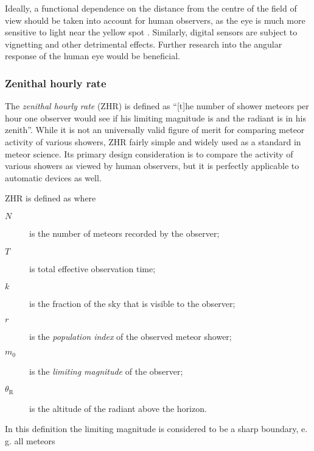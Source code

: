             Ideally, a functional dependence on the distance from the centre of the field
            of view should be taken into account for human observers, as the eye is much more
            sensitive to light near the yellow spot .
            Similarly, digital sensors are subject to vignetting and other detrimental effects.
            Further research into the angular response of the human eye would be beneficial.

        \subsubsection{Zenithal hourly rate} \label{ipqz}
            The \emph{zenithal hourly rate} (ZHR) is defined as ``[t]he number of shower meteors per hour
            one observer would see if his limiting magnitude is  and the radiant is in his zenith''.
            While it is not an universally valid figure of merit for comparing meteor activity of various showers,
            ZHR fairly simple and widely used as a standard in meteor science.
            Its primary design consideration is to compare the activity of various showers as viewed by human observers,
            but it is perfectly applicable to automatic devices as well.

            ZHR is defined as
            where
            \begin{description}
                \item[$N$]
                    is the number of meteors recorded by the observer;
                \item[$T$]
                    is total effective observation time;
                \item[$k$]
                    is the fraction of the sky that is visible to the observer;
                \item[$r$]
                    is the \emph{population index} of the observed meteor shower;
                \item[$m_0$]
                    is the \emph{limiting magnitude} of the observer;
                \item[$\theta_\mathrm{R}$]
                    is the altitude of the radiant above the horizon.
            \end{description}
            In this definition the limiting magnitude is considered to be a sharp boundary, e. g. all meteors

